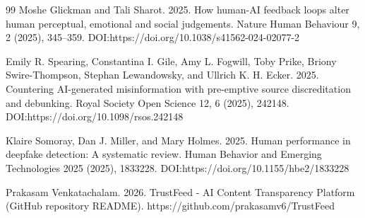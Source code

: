 \documentclass[acmlarge,screen,nonacm]{acmart}
\begin{document}
\begin{thebibliography}{99}
Moshe Glickman and Tali Sharot. 2025. How human-AI feedback loops alter human perceptual, emotional and social judgements. Nature Human Behaviour 9, 2 (2025), 345--359. DOI:https://doi.org/10.1038/s41562-024-02077-2

Emily R. Spearing, Constantina I. Gile, Amy L. Fogwill, Toby Prike, Briony Swire-Thompson, Stephan Lewandowsky, and Ullrich K. H. Ecker. 2025. Countering AI-generated misinformation with pre-emptive source discreditation and debunking. Royal Society Open Science 12, 6 (2025), 242148. DOI:https://doi.org/10.1098/rsos.242148

Klaire Somoray, Dan J. Miller, and Mary Holmes. 2025. Human performance in deepfake detection: A systematic review. Human Behavior and Emerging Technologies 2025 (2025), 1833228. DOI:https://doi.org/10.1155/hbe2/1833228

Prakasam Venkatachalam. 2026. TrustFeed - AI Content Transparency Platform (GitHub repository README). https://github.com/prakasamv6/TrustFeed

\end{thebibliography}
\end{document}
